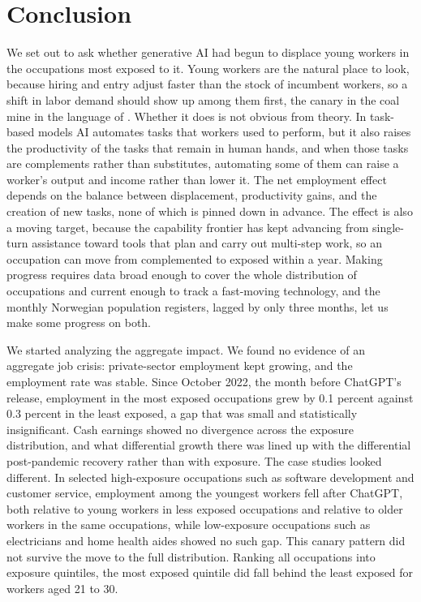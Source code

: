 \documentclass[12pt]{article}
\begin{document}
\section{Conclusion}\label{sec:conclusion}

We set out to ask whether generative AI had begun to displace young workers in the occupations most exposed to it. Young workers are the natural place to look, because hiring and entry adjust faster than the stock of incumbent workers, so a shift in labor demand should show up among them first, the canary in the coal mine in the language of \citet{brynjolfsson2025}. Whether it does is not obvious from theory. In task-based models AI automates tasks that workers used to perform, but it also raises the productivity of the tasks that remain in human hands, and when those tasks are complements rather than substitutes, automating some of them can raise a worker's output and income rather than lower it. The net employment effect depends on the balance between displacement, productivity gains, and the creation of new tasks, none of which is pinned down in advance. The effect is also a moving target, because the capability frontier has kept advancing from single-turn assistance toward tools that plan and carry out multi-step work, so an occupation can move from complemented to exposed within a year. Making progress requires data broad enough to cover the whole distribution of occupations and current enough to track a fast-moving technology, and the monthly Norwegian population registers, lagged by only three months, let us make some progress on both.

We started analyzing the aggregate impact. We found no evidence of an aggregate job crisis: private-sector employment kept growing, and the employment rate was stable. Since October 2022, the month before ChatGPT's release, employment in the most exposed occupations grew by 0.1 percent against 0.3 percent in the least exposed, a gap that was small and statistically insignificant. Cash earnings showed no divergence across the exposure distribution, and what differential growth there was lined up with the differential post-pandemic recovery rather than with exposure. The case studies looked different. In selected high-exposure occupations such as software development and customer service, employment among the youngest workers fell after ChatGPT, both relative to young workers in less exposed occupations and relative to older workers in the same occupations, while low-exposure occupations such as electricians and home health aides showed no such gap. This canary pattern did not survive the move to the full distribution. Ranking all occupations into exposure quintiles, the most exposed quintile did fall behind the least exposed for workers aged 21 to 30.  
\end{document}
